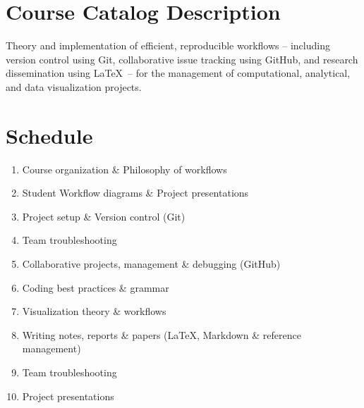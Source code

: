 \documentclass[10pt]{article}
\begin{document}
\section*{Course Catalog Description}
Theory and implementation of efficient, reproducible workflows -- including version control using Git, collaborative issue tracking using GitHub, and research dissemination using \LaTeX\ --  for the management of computational, analytical, and data visualization projects.

\section*{Schedule}
\begin{enumerate}[label=\bfseries Week \arabic*:,leftmargin=*,labelindent=1em]
	\item Course organization \& Philosophy of workflows
	\item Student Workflow diagrams \& Project presentations
	\item Project setup \& Version control (Git)
	\item Team troubleshooting
	\item Collaborative projects, management \& debugging (GitHub)
	\item Coding best practices \& grammar
	\item Visualization theory \& workflows
	\item Writing notes, reports \& papers (\LaTeX, Markdown \& reference management)
	\item Team troubleshooting
	\item Project presentations
\end{enumerate}
\end{document}
